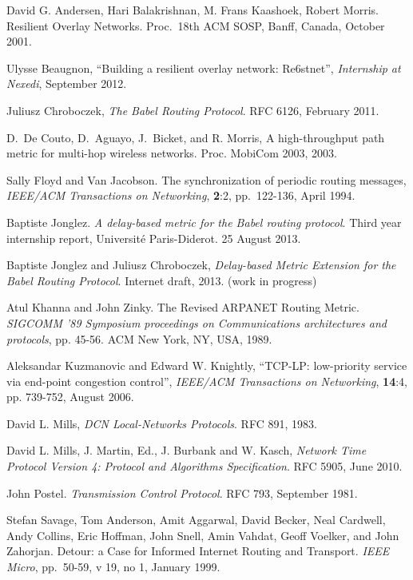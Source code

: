 \documentclass[conference,letterpaper]{IEEEtran}
\begin{document}
\begin{thebibliography}{99}

 David G. Andersen, Hari Balakrishnan, M. Frans Kaashoek,
  Robert Morris.  Resilient Overlay Networks.  Proc.\ 18th ACM SOSP,
  Banff, Canada, October 2001.

 Ulysse Beaugnon, ``Building a resilient overlay
  network: Re6stnet'', \emph{Internship at Nexedi}, September 2012.

  Juliusz Chroboczek,
  \emph{The Babel Routing Protocol}.
  RFC 6126,
  February 2011.

 D.\ De Couto, D.\ Aguayo, J.\ Bicket, and R. Morris, A
  high-throughput path metric for multi-hop wireless networks.
  Proc. MobiCom 2003, 2003.

 Sally Floyd and Van Jacobson. The synchronization of
  periodic routing messages, \emph{IEEE/ACM Transactions on
    Networking}, \textbf{2}:2, pp.\ 122-136, April 1994.

 Baptiste Jonglez.  \emph{A delay-based
    metric for the Babel routing protocol}.  Third year internship
  report, Université Paris-Diderot.  25 August 2013.

 Baptiste Jonglez and Juliusz Chroboczek,
  \emph{Delay-based Metric Extension for the Babel Routing Protocol}.
  Internet draft, 2013. (work in progress)

 Atul Khanna and John Zinky.  The Revised ARPANET
  Routing Metric. \emph{SIGCOMM '89 Symposium proceedings on
    Communications architectures and protocols}, pp. 45-56.  ACM New
  York, NY, USA, 1989.

 Aleksandar Kuzmanovic and Edward W. Knightly, ``TCP-LP:
  low-priority service via end-point congestion control'',
  \emph{IEEE/ACM Transactions on Networking}, \textbf{14}:4,
  pp. 739-752, August 2006.

 David L. Mills, \emph{DCN Local-Networks Protocols}.
  RFC 891, 1983.

 David L. Mills, J. Martin, Ed., J. Burbank and
  W. Kasch, \emph{Network Time Protocol Version 4: Protocol and
    Algorithms Specification}.  RFC 5905, June 2010.

 John Postel.  \emph{Transmission Control Protocol}.
  RFC 793, September 1981.

\newpage

 Stefan Savage, Tom Anderson, Amit Aggarwal, David
  Becker, Neal Cardwell, Andy Collins, Eric Hoffman, John Snell, Amin
  Vahdat, Geoff Voelker, and John Zahorjan.  Detour: a Case for
  Informed Internet Routing and Transport.  \emph{IEEE Micro},
  pp.\ 50-59, v 19, no 1, January 1999.


\end{thebibliography}
\end{document}

